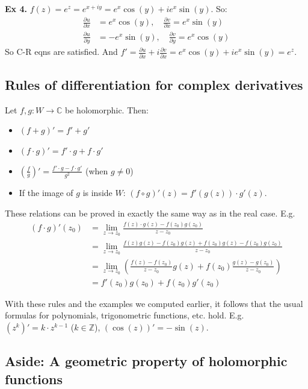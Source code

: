 \begin{example}
\textbf{Ex 4.} $f(z) = e^{z} = e^{x+iy} = e^{x}\cos(y) + ie^{x}\sin(y)$.
So:
\begin{align*}
\frac{\partial u}{\partial x} &= e^{x}\cos(y), \quad \frac{\partial v}{\partial x} = e^{x}\sin(y) \\
\frac{\partial u}{\partial y} &= -e^{x}\sin(y), \quad \frac{\partial v}{\partial y} = e^{x}\cos(y)
\end{align*}
So C-R eqns are satisfied.
And $f' = \frac{\partial u}{\partial x} + i\frac{\partial v}{\partial x} = e^{x}\cos(y) + ie^{x}\sin(y) = e^{z}$.
\end{example}

\subsection{Rules of differentiation for complex derivatives}

Let $f, g: W \rightarrow \mathbb{C}$ be holomorphic. Then:
\begin{itemize}
    \item $(f+g)' = f' + g'$
    \item $(f \cdot g)' = f' \cdot g + f \cdot g'$
    \item $\left(\frac{f}{g}\right)' = \frac{f' \cdot g - f \cdot g'}{g^{2}}$ (when $g \neq 0$)
    \item If the image of $g$ is inside $W$: $(f \circ g)'(z) = f'(g(z)) \cdot g'(z)$.
\end{itemize}

These relations can be proved in exactly the same way as in the real case. E.g.
\begin{align*}
(f \cdot g)'(z_{0}) &= \lim_{z \to z_{0}} \frac{f(z) \cdot g(z) - f(z_{0})g(z_{0})}{z - z_{0}} \\
&= \lim_{z \to z_{0}} \frac{f(z)g(z) - f(z_{0})g(z) + f(z_{0})g(z) - f(z_{0})g(z_{0})}{z - z_{0}} \\
&= \lim_{z \to z_{0}} \left( \frac{f(z)-f(z_{0})}{z - z_{0}}g(z) + f(z_{0})\frac{g(z)-g(z_{0})}{z - z_{0}} \right) \\
&= f'(z_{0})g(z_{0}) + f(z_{0})g'(z_{0})
\end{align*}

With these rules and the examples we computed earlier, it follows that the usual formulas for polynomials, trigonometric functions, etc. hold.
E.g. $(z^{k})' = k \cdot z^{k-1}$ ($k \in \mathbb{Z}$), $(\cos(z))' = -\sin(z)$.

\subsection{Aside: A geometric property of holomorphic functions}

